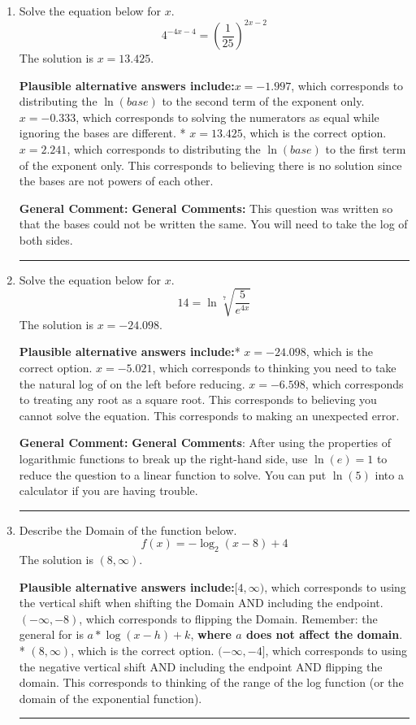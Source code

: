 \documentclass{extbook}[14pt]
\newcommand{\litem}[1]{\item #1

\rule{\textwidth}{0.4pt}}
\begin{document}
\begin{enumerate}\litem{
Solve the equation below for $x$.
\[ 4^{-4x-4} = \left(\frac{1}{25}\right)^{2x-2} \]The solution is \( x = 13.425 \).\begin{enumerate}[label=\Alph*.]
\textbf{Plausible alternative answers include:}$x = -1.997$, which corresponds to distributing the $\ln(base)$ to the second term of the exponent only.
$x = -0.333$, which corresponds to solving the numerators as equal while ignoring the bases are different.
* $x = 13.425$, which is the correct option.
$x = 2.241$, which corresponds to distributing the $\ln(base)$ to the first term of the exponent only.
This corresponds to believing there is no solution since the bases are not powers of each other.
\end{enumerate}

\textbf{General Comment:} \textbf{General Comments:} This question was written so that the bases could not be written the same. You will need to take the log of both sides.
}
\litem{
Solve the equation below for $x$.
\[  14 = \ln{\sqrt[7]{\frac{5}{e^{4x}}}} \]The solution is \( x = -24.098 \).\begin{enumerate}[label=\Alph*.]
\textbf{Plausible alternative answers include:}* $x = -24.098$, which is the correct option.
$x = -5.021$, which corresponds to thinking you need to take the natural log of on the left before reducing.
$x = -6.598$, which corresponds to treating any root as a square root.
This corresponds to believing you cannot solve the equation.
This corresponds to making an unexpected error.
\end{enumerate}

\textbf{General Comment:} \textbf{General Comments}: After using the properties of logarithmic functions to break up the right-hand side, use $\ln(e) = 1$ to reduce the question to a linear function to solve. You can put $\ln(5)$ into a calculator if you are having trouble.
}
\litem{
Describe the Domain of the function below.
\[ f(x) = -\log_2{(x-8)}+4 \]The solution is \( (8, \infty) \).\begin{enumerate}[label=\Alph*.]
\textbf{Plausible alternative answers include:}$[4, \infty)$, which corresponds to using the vertical shift when shifting the Domain AND including the endpoint.
$(-\infty, -8)$, which corresponds to flipping the Domain. Remember: the general for is $a*\log(x-h)+k$, \textbf{where $a$ does not affect the domain}.
* $(8, \infty)$, which is the correct option.
$(-\infty, -4]$, which corresponds to using the negative vertical shift AND including the endpoint AND flipping the domain.
This corresponds to thinking of the range of the log function (or the domain of the exponential function).
\end{enumerate}

}
\end{enumerate}
\end{document}
